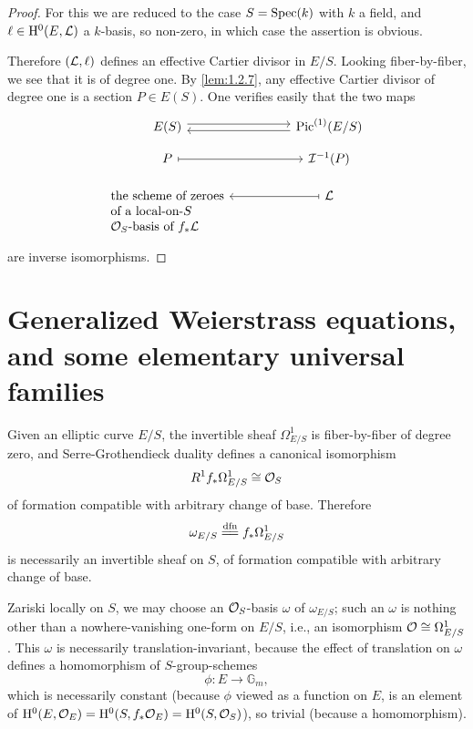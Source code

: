 \begin{proof}
For this we are reduced to the case $S = \operatorname{Spec}(k)$ with $k$ a field, and $\ell \in \mathrm{H}^0(E, \mathcal{L})$ a $k$-basis, so non-zero, in which case the assertion is obvious.

Therefore $(\mathcal{L}, \ell)$ defines an effective Cartier divisor in $E/S$. Looking fiber-by-fiber, we see that it is of degree one. By \ref{lem:1.2.7}, any effective Cartier divisor of degree one is a section $P \in E(S)$. One verifies easily that the two maps
\[
\begin{tikzcd}[column sep=huge, row sep=small]
  E(S) \arrow[r, shift left=.6ex] & \Pic^{(1)}(E/S) \arrow[l, shift left=.6ex] \\[-2pt]
  P \arrow[r, mapsto] & \cI^{-1}(P) \\[2pt]
  \begin{array}[t]{@{}l@{}}\text{the scheme of zeroes} \\ \text{of a local-on-}S \\ \cO_S\text{-basis of } f_* \cL\end{array} \arrow[r, phantom] & \cL \arrow[l, mapsto]
\end{tikzcd}
\]
are inverse isomorphisms.
\end{proof}

\section{Generalized Weierstrass equations, and some elementary universal families}
\label{sec:2.2}

\kmitem\label{item:2.2.1}
Given an elliptic curve $E/S$, the invertible sheaf $\Omega^1_{E/S}$ is fiber-by-fiber of degree zero, and Serre-Grothendieck duality defines a canonical isomorphism
\begin{equation}\label{eq:2.2.1.1}
R^1 f_* \Omega^1_{E/S} \cong \mathcal{O}_S
\end{equation}
of formation compatible with arbitrary change of base. Therefore
\begin{equation}\label{eq:2.2.1.2}
\omega_{E/S} \xlongequal{dfn} f_* \Omega^1_{E/S}
\end{equation}
is necessarily an invertible sheaf on $S$, of formation compatible with arbitrary change of base.

\kmitem\label{item:2.2.2}
Zariski locally on $S$, we may choose an $\mathcal{O}_S$-basis $\omega$ of $\omega_{E/S}$; such an $\omega$ is nothing other than a nowhere-vanishing one-form on $E/S$, i.e., an isomorphism $\mathcal{O} \cong \Omega^1_{E/S}$. This $\omega$ is necessarily translation-invariant, because the effect of translation on $\omega$ defines a homomorphism of $S$-group-schemes
\[
\phi : E \longrightarrow \mathbb{G}_m,
\]
which is necessarily constant (because $\phi$ viewed as a function on $E$, is an element of $\mathrm{H}^0(E, \mathcal{O}_E) = \mathrm{H}^0(S, f_* \mathcal{O}_E) = \mathrm{H}^0(S, \mathcal{O}_S)$), so trivial (because a homomorphism).

